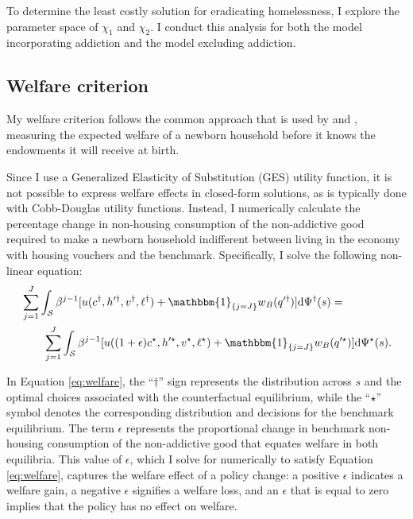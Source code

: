 \documentclass[parskip=full]{article}
\newcommand{\indicator}[1]{\mathbbm{1}_{\left\{ {#1} \right\} }}
\begin{document}
To determine the least costly solution for eradicating homelessness, I explore the parameter space of $\chi_{1}$ and $\chi_{2}$. I conduct this analysis for both the model incorporating addiction and the model excluding addiction.

\subsection{Welfare criterion}

My welfare criterion follows the common approach that is used by \citet{conesa-et-al} and \citet{gkkoc}, measuring the expected welfare of a newborn household before it knows the endowments it will receive at birth.

Since I use a Generalized Elasticity of Substitution (GES) utility function, it is not possible to express welfare effects in closed-form solutions, as is typically done with Cobb-Douglas utility functions. Instead, I numerically calculate the percentage change in non-housing consumption of the non-addictive good required to make a newborn household indifferent between living in the economy with housing vouchers and the benchmark. Specifically, I solve the following non-linear equation:
\begin{align}\label{eq:welfare}
& \sum_{j=1}^{J}\int_{\mathcal{S}} \beta^{j-1}[u(c^{\dagger},h'^{\dagger},v^{\dagger},\ell^{\dagger})+\indicator{j=J}w_{B}(q'^{\dagger})] \mathrm{d}\Psi^{\dagger}(s)= \notag \\ & \qquad \sum_{j=1}^{J}\int_{\mathcal{S}} \beta^{j-1}[u((1+\epsilon)c^{\star},h'^{\star},v^{\star},\ell^{\star})+\indicator{j=J}w_{B}(q'^{\star})] \mathrm{d}\Psi^{\star}(s).
\end{align}

\noindent In Equation \eqref{eq:welfare}, the ``$\dagger$'' sign represents the distribution across $s$ and the optimal choices associated with the counterfactual equilibrium, while the ``$\star$'' symbol denotes the corresponding distribution and decisions for the benchmark equilibrium. The term $\epsilon$ represents the proportional change in benchmark non-housing consumption of the non-addictive good that equates welfare in both equilibria. This value of $\epsilon$, which I solve for numerically to satisfy Equation \eqref{eq:welfare}, captures the welfare effect of a policy change: a positive $\epsilon$ indicates a welfare gain, a negative $\epsilon$ signifies a welfare loss, and an $\epsilon$ that is equal to zero implies that the policy has no effect on welfare.
\end{document}
